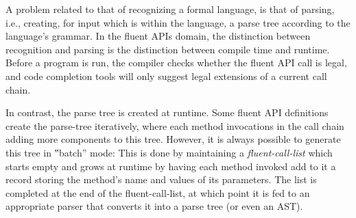 A problem related to that of recognizing a formal language,
is that of parsing, i.e., creating, for input which is within the language,
  a parse tree according to the language's grammar.
In the fluent APIs domain, the distinction between recognition and parsing is
  the distinction between compile time and runtime.
Before a program is run, the compiler checks whether the fluent API call is legal,
  and code completion tools will only suggest legal extensions of a current call chain.

In contrast, the parse tree is created at runtime.
Some fluent API definitions create the parse-tree
  iteratively, where each method invocations in the call chain adding
  more components to this tree.
However, it is always possible to generate this tree in ‟batch” mode:
This is done by maintaining a \emph{fluent-call-list} which
  starts empty and grows at runtime by having each method invoked add to it
  a record storing the method's name and values of its parameters.
The list is completed at the end of the fluent-call-list, at which point it is fed to an appropriate parser that
  converts it into a parse tree (or even an AST).

